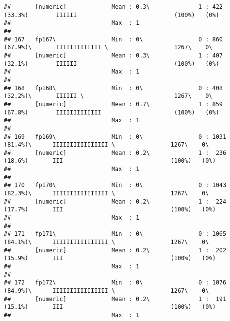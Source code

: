 \documentclass[]{article}
\begin{document}
\begin{verbatim}
##       [numeric]             Mean : 0.3\              1 : 422 (33.3%)        IIIIII                            (100%)   (0%)     
##                             Max  : 1                                                                                            
## 
## 167   fp167\                Min  : 0\                0 : 860 (67.9%)\       IIIIIIIIIIIII \                   1267\    0\       
##       [numeric]             Mean : 0.3\              1 : 407 (32.1%)        IIIIII                            (100%)   (0%)     
##                             Max  : 1                                                                                            
## 
## 168   fp168\                Min  : 0\                0 : 408 (32.2%)\       IIIIII \                          1267\    0\       
##       [numeric]             Mean : 0.7\              1 : 859 (67.8%)        IIIIIIIIIIIII                     (100%)   (0%)     
##                             Max  : 1                                                                                            
## 
## 169   fp169\                Min  : 0\                0 : 1031 (81.4%)\      IIIIIIIIIIIIIIII \                1267\    0\       
##       [numeric]             Mean : 0.2\              1 :  236 (18.6%)       III                               (100%)   (0%)     
##                             Max  : 1                                                                                            
## 
## 170   fp170\                Min  : 0\                0 : 1043 (82.3%)\      IIIIIIIIIIIIIIII \                1267\    0\       
##       [numeric]             Mean : 0.2\              1 :  224 (17.7%)       III                               (100%)   (0%)     
##                             Max  : 1                                                                                            
## 
## 171   fp171\                Min  : 0\                0 : 1065 (84.1%)\      IIIIIIIIIIIIIIII \                1267\    0\       
##       [numeric]             Mean : 0.2\              1 :  202 (15.9%)       III                               (100%)   (0%)     
##                             Max  : 1                                                                                            
## 
## 172   fp172\                Min  : 0\                0 : 1076 (84.9%)\      IIIIIIIIIIIIIIII \                1267\    0\       
##       [numeric]             Mean : 0.2\              1 :  191 (15.1%)       III                               (100%)   (0%)     
##                             Max  : 1                                                                                            

\end{verbatim}
\end{document}
